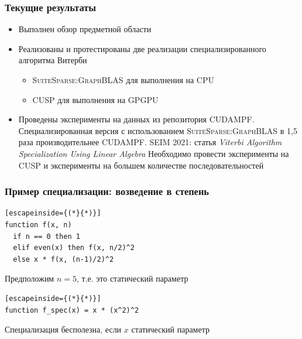 \documentclass{beamer}
\newcommand\name[1]{\textsc{#1}}
\newcommand{\backupbegin}{
   \newcounter{finalframe}
   \setcounter{finalframe}{\value{framenumber}}
}
\begin{document}
\begin{frame}[fragile]
	\frametitle{Текущие результаты}
\begin{itemize}
	\item Выполнен обзор предметной области
	\item Реализованы и протестированы две реализации специализированного алгоритма Витерби
		\begin{itemize}
			\item \name{Sui\-te\-Spar\-se:Graph\-BLAS} для выполнения на CPU
			\item \name{CUSP} для выполнения на GPGPU
		\end{itemize}
	\item Проведены эксперименты на данных из репозитория \name{CUDAMPF}. 
Специализированная версия с использованием 
\name{Sui\-te\-Spar\-se:Graph\-BLAS} в 1,5 раза 
производительнее \name{CUDAMPF}.
\vfill
\name{SEIM 2021}: статья \emph{Viterbi Algorithm Specialization Using Linear Algebra} 
\vfill
Необходимо провести эксперименты на \name{CUSP} и эксперименты на большем количестве последовательностей
\end{itemize}
\end{frame}



\appendix
\backupbegin

\begin{frame}[fragile]
	\frametitle{Пример специализации: возведение в степень}
\begin{lstlisting}[escapeinside={(*}{*)}]
function f(x, n)
  if n == 0 then 1
  elif even(x) then f(x, n/2)^2
  else x * f(x, (n-1)/2)^2
\end{lstlisting}
	\vfill
	Предположим $\mathit{n = 5}$, т.е. это статический параметр
	\vfill
\begin{lstlisting}[escapeinside={(*}{*)}]
function f_spec(x) = x * (x^2)^2
\end{lstlisting}
	\vfill
	Специализация бесполезна, если $x$ статический параметр
\end{frame}
\end{document}
